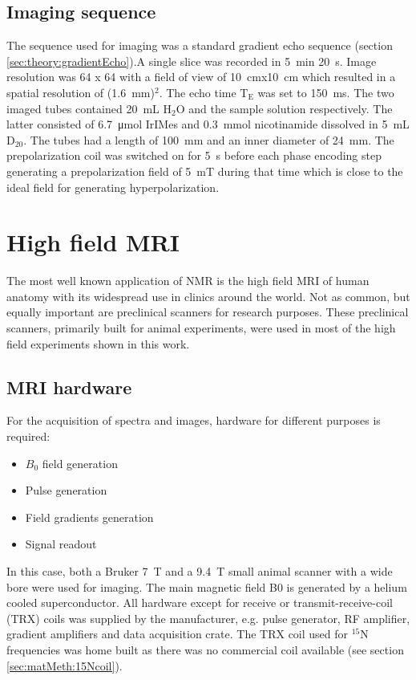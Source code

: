         \subsection{Imaging sequence}
        The sequence used for imaging was a standard gradient echo sequence (section \ref{sec:theory:gradientEcho}).A single slice was recorded in \SI{5}{\minute} \SI{20}{\second}. Image resolution was 64 x 64 with a field of view of \SI{10}{\cm}x\SI{10}{\cm} which resulted in a spatial resolution of (\SI{1.6}{\mm})$^2$. The echo time $\mathrm{T_E}$ was set to \SI{150}{\milli\second}. The two imaged tubes contained \SI{20}{\milli\liter} H$_2$O and the sample solution respectively. The latter consisted of \SI{6.7}{\micro\mole} IrIMes and \SI{0.3}{\milli\mole} nicotinamide dissolved in \SI{5}{\milli\liter} $\mathrm{D_20}$. The tubes had a length of \SI{100}{\milli\meter} and an inner diameter of \SI{24}{\milli\meter}. The prepolarization coil was switched on for \SI{5}{\second} before each phase encoding step generating a prepolarization field of \SI{5}{\milli\tesla} during that time which is close to the ideal field for generating hyperpolarization.
    \section{High field MRI}
        The most well known application of NMR is the high field MRI of human anatomy with its widespread use in clinics around the world. Not as common, but equally important are preclinical scanners for research purposes. These preclinical scanners, primarily built for animal experiments, were used in most of the high field experiments shown in this work.  
        \subsection{MRI hardware}
            For the acquisition of spectra and images, hardware for different purposes is required:
            \begin{itemize}
            \item $B_0$ field generation
            \item Pulse generation
            \item Field gradients generation
            \item Signal readout
            \end{itemize}
            In this case, both a Bruker \SI{7}{\tesla} and a \SI{9.4}{\tesla} small animal scanner with a wide bore were used for imaging. The main magnetic field B0 is generated by a helium cooled superconductor. All hardware except for receive or transmit-receive-coil (TRX) coils was supplied by the manufacturer, e.g. pulse generator, RF amplifier, gradient amplifiers and data acquisition crate. The TRX coil used for $^{15}$N frequencies was home built as there was no commercial coil available (see section \ref{sec:matMeth:15Ncoil}).
